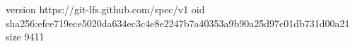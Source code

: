 version https://git-lfs.github.com/spec/v1
oid sha256:efce719ece5020da634ec3c4e8e2247b7a40353a9b90a25d97c01db731d00a21
size 9411
